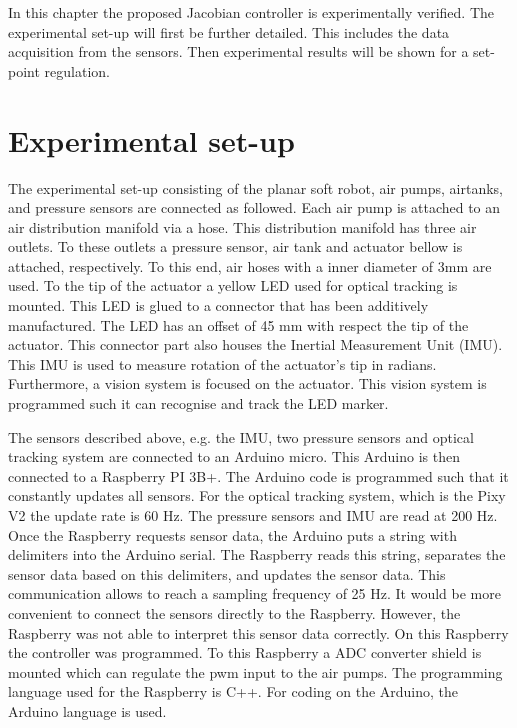 In this chapter the proposed Jacobian controller is experimentally verified. The experimental set-up will first be further detailed. This includes the data acquisition from the sensors. Then experimental results will be shown for a set-point regulation.  


\section{Experimental set-up}

The experimental set-up consisting of the planar soft robot, air pumps, airtanks, and pressure sensors are connected as followed. Each air pump is attached to an air distribution manifold via a hose. This distribution manifold has three air outlets. To these outlets a pressure sensor, air tank and actuator bellow is attached, respectively. To this end, air hoses with a inner diameter of 3mm are used. To the tip of the actuator a yellow LED used for optical tracking is mounted. This LED is glued to a 
connector that has been additively manufactured. The LED has an offset of 45 mm with respect the tip of the actuator. This connector part also houses the Inertial Measurement Unit (IMU). This IMU is used to measure  rotation of the actuator's tip in radians. Furthermore, a vision system is focused on the actuator. This vision system is programmed such it can recognise and track the LED marker. 

The sensors described above, e.g. the IMU, two pressure sensors and optical tracking system are connected to an Arduino micro. This Arduino is then connected to a Raspberry PI 3B+. The Arduino code is programmed such that it constantly updates all sensors. For the optical tracking system, which is the Pixy V2 the update rate is 60 Hz. The pressure sensors and IMU are read at 200 Hz. Once the Raspberry requests sensor data, the Arduino puts a string with delimiters into the Arduino serial. The Raspberry reads this string, separates the sensor data based on this delimiters, and updates the sensor data. This communication allows to reach a sampling frequency of 25 Hz. It would be more convenient to connect the sensors directly to the Raspberry. However, the Raspberry was not able to interpret this sensor data correctly. On this Raspberry the controller was programmed. To this Raspberry a ADC converter shield is mounted which can regulate the pwm input to the air pumps. The programming language used for the Raspberry is C++. For coding on the Arduino, the Arduino language is used. 

